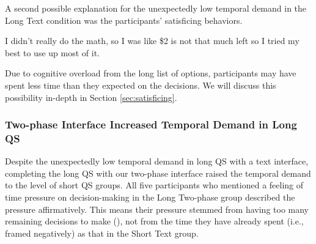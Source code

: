 A second possible explanation for the unexpectedly low temporal demand in the Long Text condition was the participants' satisficing behaviors. 

\begin{displayquote}
I didn't really do the math, so I was like \$2 is not that much left so I tried my best to use up most of it. \\\hfill{}
\end{displayquote}

Due to cognitive overload from the long list of options, participants may have spent less time than they expected on the decisions. We will discuss this possibility in-depth in Section \ref{sec:satisficing}.

\subsubsection{Two-phase Interface Increased Temporal Demand in Long QS} Despite the unexpectedly low temporal demand in long QS with a text interface, completing the long QS with our two-phase interface raised the temporal demand to the level of short QS groups. All five participants who mentioned a feeling of time pressure on decision-making in the Long Two-phase group described the pressure affirmatively. This means their pressure stemmed from having too many remaining decisions to make (), not from the time they have already spent (i.e., framed negatively) as that in the Short Text group. 


